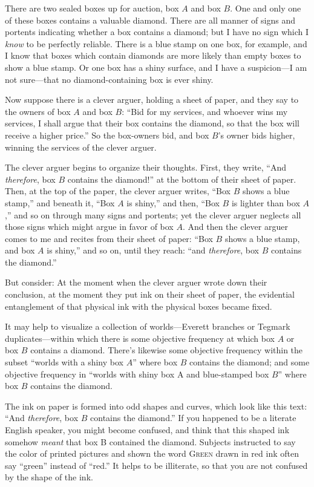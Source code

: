 {
 There are two sealed boxes up for auction, box $A$ and box $B$. One
and only one of these boxes contains a valuable diamond. There are all
manner of signs and portents indicating whether a box contains a
diamond; but I have no sign which I \textit{know} to be perfectly
reliable. There is a blue stamp on one box, for example, and I know
that boxes which contain diamonds are more likely than empty boxes to
show a blue stamp. Or one box has a shiny surface, and I have a
suspicion---I am not sure---that no diamond-containing box is ever
shiny. }

{
 Now suppose there is a clever arguer, holding a sheet of paper,
and they say to the owners of box $A$ and box $B$: ``Bid
for my services, and whoever wins my services, I shall argue that their
box contains the diamond, so that the box will receive a higher
price.'' So the box-owners bid, and box
$B$'s owner bids higher, winning the services of the
clever arguer.}

{
 The clever arguer begins to organize their thoughts. First, they
write, ``And \textit{therefore}, box $B$ contains the
diamond!'' at the bottom of their sheet of paper.
Then, at the top of the paper, the clever arguer writes,
``Box $B$ shows a blue stamp,'' and
beneath it, ``Box $A$ is shiny,'' and
then, ``Box $B$ is lighter than box
$A$,'' and so on through many signs and portents; yet
the clever arguer neglects all those signs which might argue in favor
of box $A$. And then the clever arguer comes to me and recites from their
sheet of paper: ``Box $B$ shows a blue stamp, and box $A$
is shiny,'' and so on, until they reach:
``and \textit{therefore}, box $B$ contains the
diamond.''}

{
 But consider: At the moment when the clever arguer wrote down
their conclusion, at the moment they put ink on their sheet of paper,
the evidential entanglement of that physical ink with the physical
boxes became fixed.}

{
 It may help to visualize a collection of worlds---Everett branches
or Tegmark duplicates{}---within which there is some objective
frequency at which box $A$ or box $B$ contains a diamond.
There's likewise some objective frequency within the
subset ``worlds with a shiny box $A$''
where box $B$ contains the diamond; and some objective frequency in
``worlds with shiny box A and blue-stamped box
$B$'' where box $B$ contains the diamond.}

{
 The ink on paper is formed into odd shapes and curves, which look
like this text: ``And \textit{therefore}, box $B$
contains the diamond.'' If you happened to be a
literate English speaker, you might become confused, and think that
this shaped ink somehow \textit{meant} that box B contained the
diamond. Subjects instructed to say the color of printed pictures and
shown the word \textsc{\color{red} Green} drawn in red ink often say
``green'' instead of
``red.'' It helps to be illiterate,
so that you are not confused by the shape of the ink.}

